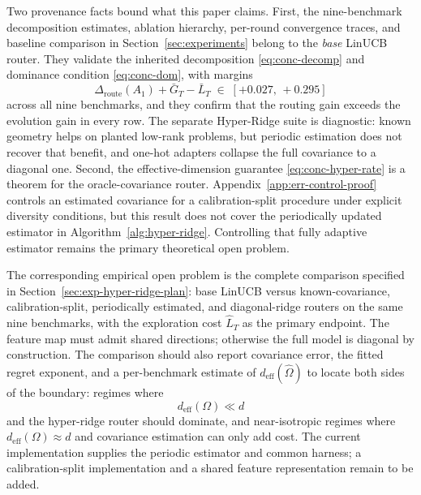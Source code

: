 \documentclass{article} %
\begin{document}
Two provenance facts bound what this paper claims. First, the nine-benchmark decomposition estimates, ablation hierarchy, per-round convergence traces, and baseline comparison in Section~\ref{sec:experiments} belong to the \emph{base} LinUCB router. They validate the inherited decomposition \eqref{eq:conc-decomp} and dominance condition \eqref{eq:conc-dom}, with margins
\begin{equation}
\label{eq:conc-margins}
\Delta_{\mathrm{route}}(A_1) + \bar G_T - \bar L_T \;\in\; [+0.027,\, +0.295]
\end{equation}
across all nine benchmarks, and they confirm that the routing gain exceeds the evolution gain in every row. The separate Hyper-Ridge suite is diagnostic: known geometry helps on planted low-rank problems, but periodic estimation does not recover that benefit, and one-hot adapters collapse the full covariance to a diagonal one. Second, the effective-dimension guarantee \eqref{eq:conc-hyper-rate} is a theorem for the oracle-covariance router. Appendix~\ref{app:err-control-proof} controls an estimated covariance for a calibration-split procedure under explicit diversity conditions, but this result does not cover the periodically updated estimator in Algorithm~\ref{alg:hyper-ridge}. Controlling that fully adaptive estimator remains the primary theoretical open problem.

The corresponding empirical open problem is the complete comparison specified in Section~\ref{sec:exp-hyper-ridge-plan}: base LinUCB versus known-covariance, calibration-split, periodically estimated, and diagonal-ridge routers on the same nine benchmarks, with the exploration cost $\widehat L_T$ as the primary endpoint. The feature map must admit shared directions; otherwise the full model is diagonal by construction. The comparison should also report covariance error, the fitted regret exponent, and a per-benchmark estimate of $d_{\mathrm{eff}}(\widehat\Omega)$ to locate both sides of the boundary: regimes where
\begin{equation}
\label{eq:conc-regime}
d_{\mathrm{eff}}(\Omega) \ll d
\end{equation}
and the hyper-ridge router should dominate, and near-isotropic regimes where $d_{\mathrm{eff}}(\Omega)\approx d$ and covariance estimation can only add cost. The current implementation supplies the periodic estimator and common harness; a calibration-split implementation and a shared feature representation remain to be added.
\end{document}
